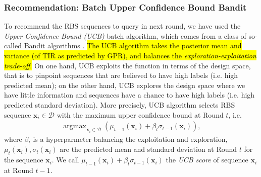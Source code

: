 
\subsubsection{Recommendation: Batch Upper Confidence Bound Bandit}

To recommend the RBS sequences to query in next round, we have used the \textit{Upper Confidence Bound (UCB)} batch algorithm,
which comes from a class of so-called Bandit algorithms \cite{srinivas2012information}.
\hl{The UCB algorithm takes the posterior mean and variance (of TIR as predicted by GPR),
and balances the \textit{exploration-exploitation trade-off}.}
On one hand, UCB exploits the function in terms of the design space, that is to pinpoint sequences that are believed to have high labels (i.e. high predicted mean);
on the other hand, UCB explores the design space where we have little information and sequences have a chance to have high labels (i.e. high predicted standard deviation).
More precisely, UCB algorithm selects RBS sequence $\mathbf{x}_i \in \mathcal{D}$ with the maximum upper confidence bound at Round $t$, i.e.
\begin{align}
\label{Eq: GPUCB}
    \operatorname{argmax}_{\mathbf{x}_i \in \mathcal{D}} \left( \mu_{t-1}(\mathbf{x}_i) + \beta_t \sigma_{t-1}(\mathbf{x}_i)\right),
\end{align}
where $\beta_t$ is a hyperparmeter balancing the exploitation and exploration,
$\mu_t(\mathbf{x}_i), \sigma_t(\mathbf{x}_i)$ are the predicted mean and standard deviation at Round $t$ for the sequence $\mathbf{x}_i$.
We call $\mu_{t-1}(\mathbf{x}_i) + \beta_t \sigma_{t-1}(\mathbf{x}_i)$ the \textit{UCB score} of sequence $\mathbf{x}_i$ at Round $t-1$.\\


